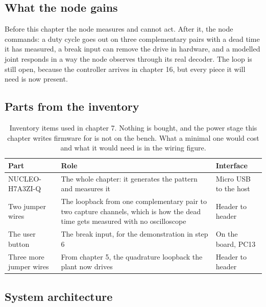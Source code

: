 \subsection*{What the node gains}

Before this chapter the node measures and cannot act. After it, the node
commands: a duty cycle goes out on three complementary pairs with a dead time it
has measured, a break input can remove the drive in hardware, and a modelled
joint responds in a way the node observes through its real decoder. The loop is
still open, because the controller arrives in chapter 16, but every piece it
will need is now present.

\subsection*{Parts from the inventory}

\begin{table}[H]\centering\small
\begin{tabular}{p{40mm}p{66mm}p{40mm}}
\toprule
Part & Role & Interface \\
\midrule
NUCLEO-H7A3ZI-Q & The whole chapter: it generates the pattern and measures it & Micro USB to the host \\
Two jumper wires & The loopback from one complementary pair to two capture channels, which is how the dead time gets measured with no oscilloscope & Header to header \\
The user button & The break input, for the demonstration in step 6 & On the board, PC13 \\
Three more jumper wires & From chapter 5, the quadrature loopback the plant now drives & Header to header \\
\bottomrule
\end{tabular}
\caption{Inventory items used in chapter 7. Nothing is bought, and the power stage this chapter writes firmware for is not on the bench. What a minimal one would cost and what it would need is in the wiring figure.}
\end{table}

\subsection*{System architecture}


